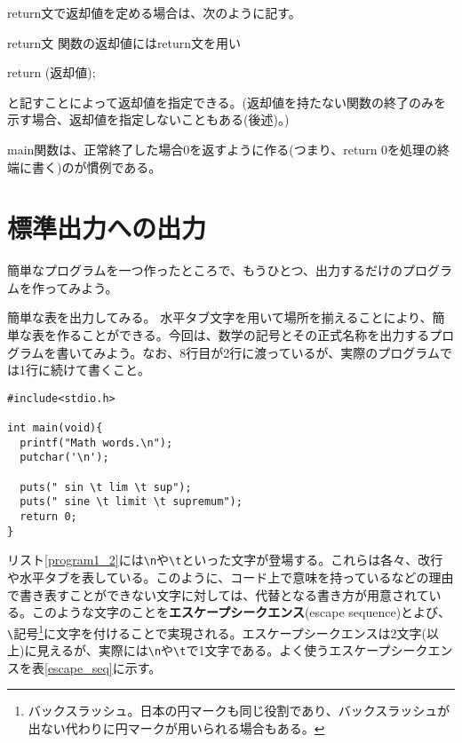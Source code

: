 return文で返却値を定める場合は、次のように記す。
\begin{itembox}[l]{return文}
関数の返却値にはreturn文を用い
\begin{code}
return (返却値);
\end{code}
と記すことによって返却値を指定できる。(返却値を持たない関数の終了のみを示す場合、返却値を指定しないこともある(後述)。)
\end{itembox}

main関数は、正常終了した場合0を返すように作る(つまり、return 0を処理の終端に書く)のが慣例である。

\section{標準出力への出力}
簡単なプログラムを一つ作ったところで、もうひとつ、出力するだけのプログラムを作ってみよう。
\begin{boxnote}
\begin{multicols}{2}
簡単な表を出力してみる。
水平タブ文字を用いて場所を揃えることにより、簡単な表を作ることができる。今回は、数学の記号とその正式名称を出力するプログラムを書いてみよう。なお、8行目が2行に渡っているが、実際のプログラムでは1行に続けて書くこと。

\begin{lstlisting}[caption=数学の記号表出力,label=program1_2]
#include<stdio.h>

int main(void){
  printf("Math words.\n");
  putchar('\n');

  puts(" sin \t lim \t sup");
  puts(" sine \t limit \t supremum");
  return 0;
}
\end{lstlisting}
\end{multicols}
\end{boxnote}
リスト\ref{program1_2}には\verb|\n|や\verb|\t|といった文字が登場する。これらは各々、改行や水平タブを表している。このように、コード上で意味を持っているなどの理由で書き表すことができない文字に対しては、代替となる書き方が用意されている。このような文字のことを\textbf{エスケープシークエンス}(escape sequence)とよび、\verb|\|記号\footnote{バックスラッシュ。日本の円マークも同じ役割であり、バックスラッシュが出ない代わりに円マークが用いられる場合もある。}に文字を付けることで実現される。エスケープシークエンスは2文字(以上)に見えるが、実際には\verb|\n|や\verb|\t|で1文字である。よく使うエスケープシークエンスを表\ref{escape_seq}に示す。
